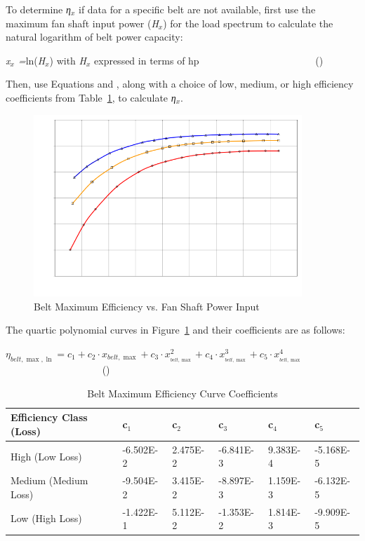 To determine \emph{η\(_{x}\)} if data for a specific belt are not available, first use the maximum fan shaft input power (\emph{H\(_{x}\)}) for the load spectrum to calculate the natural logarithm of belt power capacity:

\emph{x\(_{x}\) =}ln(\emph{H\(_{x}\)}) with \emph{H\(_{x}\)} expressed in terms of hp~~~~~~~~~~~~~~~~~~~~~~~ ()

Then, use Equations and , along with a choice of low, medium, or high efficiency coefficients from Table~\ref{table:belt-maximum-efficiency-curve-coefficients}, to calculate \emph{η\(_{x}\)}.

\begin{figure}[hbtp] %
\centering
\includegraphics[width=0.9\textwidth, height=0.9\textheight, keepaspectratio=true]{media/image4907.svg.png}
\caption{Belt Maximum Efficiency vs. Fan Shaft Power Input \protect \label{fig:belt-maximum-efficiency-vs.-fan-shaft-power}}
\end{figure}

The quartic polynomial curves in Figure~\ref{fig:belt-maximum-efficiency-vs.-fan-shaft-power} and their coefficients are as follows:

\({\eta_{belt,\max ,\ln }} = {c_1} + {c_2} \cdot {x_{belt,\max }} + {c_3} \cdot x_{_{belt,\max }}^2 + {c_4} \cdot x_{_{belt,\max }}^3 + {c_5} \cdot x_{_{belt,\max }}^4\) ~~~~~~~~~~~~~~~~~~~ ()

\begin{longtable}[c]{p{1.0in}p{1.0in}p{1.0in}p{1.0in}p{1.0in}p{1.0in}}
\caption{Belt Maximum Efficiency Curve Coefficients \protect \label{table:belt-maximum-efficiency-curve-coefficients}}\\
\toprule 
Efficiency Class (Loss) & c\(_1\) & c\(_2\) & c\(_3\) & c\(_4\) & c\(_5\) \tabularnewline \midrule
\endhead
High (Low Loss) & -6.502E-2 & 2.475E-2 & -6.841E-3 & 9.383E-4 & -5.168E-5 \tabularnewline
Medium (Medium Loss) & -9.504E-2 & 3.415E-2 & -8.897E-3 & 1.159E-3 & -6.132E-5 \tabularnewline
Low (High Loss) & -1.422E-1 & 5.112E-2 & -1.353E-2 & 1.814E-3 & -9.909E-5 \tabularnewline
\bottomrule
\end{longtable}

